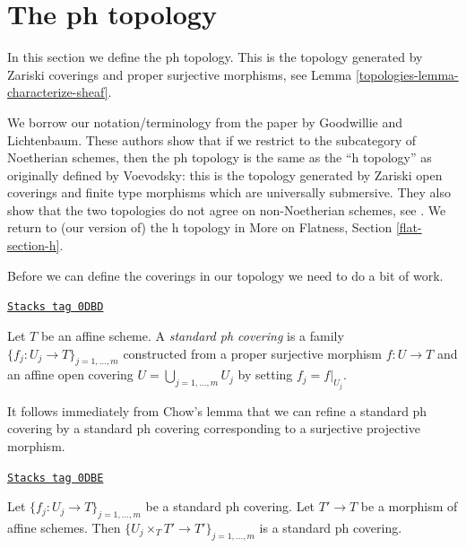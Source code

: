 \section{The ph topology}
\label{topologies-section-ph}
In this section we define the ph topology. This is the topology
generated by Zariski coverings and proper surjective morphisms, see
Lemma \ref{topologies-lemma-characterize-sheaf}.

\medskip\noindent
We borrow our notation/terminology
from the paper \cite{ph} by Goodwillie and Lichtenbaum.
These authors show that if we restrict to the subcategory of
Noetherian schemes, then the ph topology is the same as the
``h topology'' as originally defined by Voevodsky: this is
the topology generated by Zariski open coverings and
finite type morphisms which are universally submersive.
They also show that the two topologies do not agree on
non-Noetherian schemes, see \cite[Example 4.5]{ph}.
We return to (our version of) the h topology in
More on Flatness, Section \ref{flat-section-h}.

\medskip\noindent
Before we can define the coverings in our topology we need to do
a bit of work.

\begin{definition}
\label{topologies-definition-standard-ph-covering}
\href{https://stacks.math.columbia.edu/tag/0DBD}{\texttt{Stacks tag 0DBD}}

Let $T$ be an affine scheme. A {\it standard ph covering} is a family
$\{f_j : U_j \to T\}_{j = 1, \ldots, m}$ constructed from a
proper surjective morphism $f : U \to T$ and an affine open covering
$U = \bigcup_{j = 1, \ldots, m} U_j$ by setting $f_j = f|_{U_j}$.
\end{definition}

It follows immediately from Chow's lemma that we can refine a
standard ph covering by a standard ph covering corresponding to
a surjective projective morphism.

\begin{lemma}
\label{topologies-lemma-base-change-standard-ph}
\href{https://stacks.math.columbia.edu/tag/0DBE}{\texttt{Stacks tag 0DBE}}

Let $\{f_j : U_j \to T\}_{j = 1, \ldots, m}$ be a standard ph covering.
Let $T' \to T$ be a morphism of affine schemes.
Then $\{U_j \times_T T' \to T'\}_{j = 1, \ldots, m}$ is a
standard ph covering.
\end{lemma}

